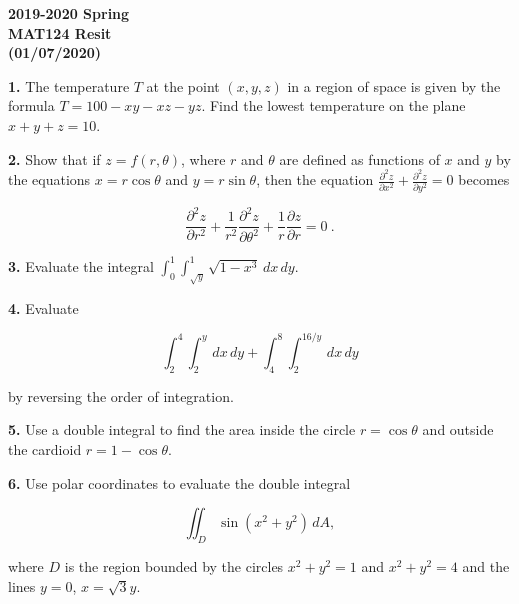 \documentclass{article}
\begin{document}
\pagestyle{empty}
\large

\begin{center}
\textbf{2019-2020 Spring \\MAT124 Resit\\(01/07/2020)}
\end{center}

\textbf{1.} The temperature $T$ at the point $(x,y,z)$ in a region of space is given by the formula $T=100-xy-xz-yz$. Find the lowest temperature on the plane $x+y+z=10$.

\vspace{1em}

\textbf{2.} Show that if $z=f(r, \theta)$, where $r$ and $\theta$ are defined as functions of $x$ and $y$ by the equations $x=r\cos\theta$ and $y=r\sin\theta$, then the equation $\displaystyle\frac{\partial^2z}{\partial x^2}+\frac{\partial ^2z}{\partial y^2} = 0$ becomes

\begin{equation*}
    \frac{\partial^2z}{\partial r^2}+\frac{1}{r^2}\frac{\partial^2z}{\partial\theta^2}+\frac{1}{r}\frac{\partial z}{\partial r}  = 0\:.
\end{equation*}

\vspace{1em}

\textbf{3.} Evaluate the integral $\displaystyle \int_0^1\int_{\sqrt y}^1 \sqrt{1-x^3}\,dx\,dy$.

\vspace{1em}

\textbf{4.} Evaluate

\[\displaystyle \int_2^4\int_2^y\,dx\,dy + \int_4^8\int_2^{16/y}\,dx\,dy\]

by reversing the order of integration.

\vspace{1em}

\textbf{5.} Use a double integral to find the area inside the circle $r=\cos\theta$ and outside the cardioid $r=1-\cos\theta$.

\vspace{1em}

\textbf{6.} Use polar coordinates to evaluate the double integral

\[\displaystyle\iint_D\sin\left(x^2+y^2\right)\,dA,\]

where $D$ is the region bounded by the circles $x^2+y^2=1$ and $x^2+y^2=4$ and the lines $y=0$, $x=\sqrt3 y$.

\vspace{1em}
\end{document}
